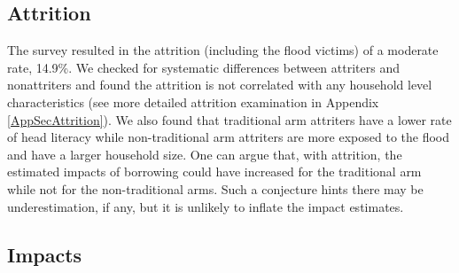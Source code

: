 \subsection{Attrition}
\label{SecAttrition}

	The survey resulted in the attrition (including the flood victims) of a moderate rate, 14.9\%. We checked for systematic differences between attriters and nonattriters 
	and found the attrition is not correlated with any household level characteristics (see more detailed attrition examination in Appendix \ref{AppSecAttrition}). %
	We also found that \textsf{traditional} arm attriters have a lower rate of head literacy while non-\textsf{traditional} arm attriters are more exposed to the flood and have a larger household size. One can argue that, with attrition, the estimated impacts of borrowing could have increased for the \textsf{traditional} arm while not for the non-\textsf{traditional} arms. Such a conjecture hints there may be underestimation, if any, but it is unlikely to inflate the impact estimates.

\subsection{Impacts}
\label{Sec Impacts}


